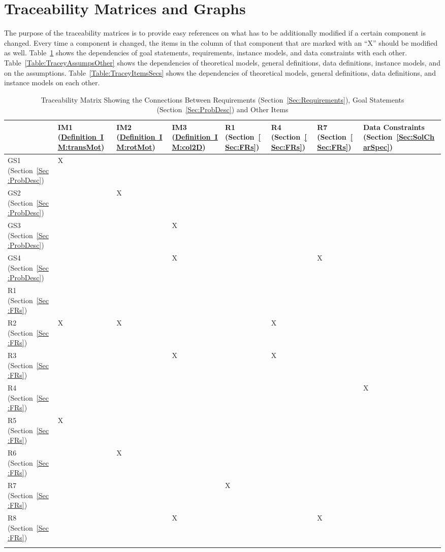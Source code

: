 \documentclass[12pt]{article}
\begin{document}
\section{Traceability Matrices and Graphs}
\label{Sec:TraceMatrices}
The purpose of the traceability matrices is to provide easy references on what has to be additionally modified if a certain component is changed. Every time a component is changed, the items in the column of that component that are marked with an ``X'' should be modified as well. Table~\ref{Table:TraceyReqGoalsOther} shows the dependencies of goal statements, requirements, instance models, and data constraints with each other. Table~\ref{Table:TraceyAssumpsOther} shows the dependencies of theoretical models, general definitions, data definitions, instance models, and on the assumptions. Table~\ref{Table:TraceyItemsSecs} shows the dependencies of theoretical models, general definitions, data definitions, and instance models on each other.
\begin{longtable}{l l l l l l l l}
\toprule
 & IM1 (\hyperref[IM:transMot]{Definition~IM:transMot}) & IM2 (\hyperref[IM:rotMot]{Definition~IM:rotMot}) & IM3 (\hyperref[IM:col2D]{Definition~IM:col2D}) & R1 (Section~\ref{Sec:FRs}) & R4 (Section~\ref{Sec:FRs}) & R7 (Section~\ref{Sec:FRs}) & Data Constraints (Section~\ref{Sec:SolCharSpec})
\\
\midrule
GS1 (Section~\ref{Sec:ProbDesc}) & X &  &  &  &  &  & 
\\
GS2 (Section~\ref{Sec:ProbDesc}) &  & X &  &  &  &  & 
\\
GS3 (Section~\ref{Sec:ProbDesc}) &  &  & X &  &  &  & 
\\
GS4 (Section~\ref{Sec:ProbDesc}) &  &  & X &  &  & X & 
\\
R1 (Section~\ref{Sec:FRs}) &  &  &  &  &  &  & 
\\
R2 (Section~\ref{Sec:FRs}) & X & X &  &  & X &  & 
\\
R3 (Section~\ref{Sec:FRs}) &  &  & X &  & X &  & 
\\
R4 (Section~\ref{Sec:FRs}) &  &  &  &  &  &  & X
\\
R5 (Section~\ref{Sec:FRs}) & X &  &  &  &  &  & 
\\
R6 (Section~\ref{Sec:FRs}) &  & X &  &  &  &  & 
\\
R7 (Section~\ref{Sec:FRs}) &  &  &  & X &  &  & 
\\
R8 (Section~\ref{Sec:FRs}) &  &  & X &  &  & X & 
\\
\bottomrule
\caption{Traceability Matrix Showing the Connections Between Requirements (Section~\ref{Sec:Requirements}), Goal Statements (Section~\ref{Sec:ProbDesc}) and Other Items}
\label{Table:TraceyReqGoalsOther}
\end{longtable}
\end{document}
